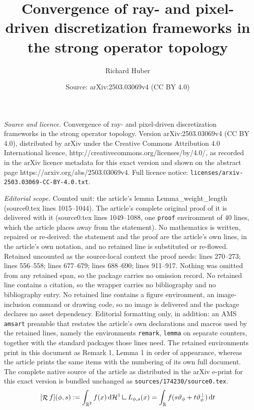 \documentclass[10pt,a4paper]{amsart}
\title{Convergence of ray- and pixel-driven discretization frameworks in the strong operator topology}
\author{Richard Huber}
\date{Source: arXiv:2503.03069v4 (CC BY 4.0)}
\DeclareMathOperator{\RR}{\mathbb{R}}
\DeclareMathOperator{\Radon}{\mathcal{R}}
\newcommand{\dd}[1]{\,\mathrm{d}{#1}}
\newcommand{\mres}{\mathbin{\vrule height 1.6ex depth 0pt width
0.13ex\vrule height 0.13ex depth 0pt width 1.3ex}}
\begin{document}
\maketitle

\noindent\emph{Source and licence.} Convergence of ray- and pixel-driven discretization frameworks in the strong operator topology. Version arXiv:2503.03069v4 (CC BY 4.0), distributed by arXiv under the Creative Commons Attribution 4.0 International licence, http://creativecommons.org/licenses/by/4.0/, as recorded in the arXiv licence metadata for this exact version and shown on the abstract page https://arxiv.org/abs/2503.03069v4. Full licence notice: \texttt{licenses/arxiv-2503.03069-CC-BY-4.0.txt}.\par\smallskip

\noindent\textit{Editorial scope.} Counted unit: the article's lemma Lemma\_weight\_length (source0.tex lines 1015--1044). The article's complete original proof of it is delivered with it (source0.tex lines 1049--1088, one \texttt{proof} environment of 40 lines, which the article places away from the statement). No mathematics is written, repaired or re-derived: the statement and the proof are the article's own lines, in the article's own notation, and no retained line is substituted or re-flowed.  Retained uncounted as the source-local context the proof needs: lines 270--273; lines 556--558; lines 677--679; lines 688--690; lines 911--917.  Nothing was omitted from any retained span, so the package carries no omission record.  No retained line contains a citation, so the wrapper carries no bibliography and no bibliography entry.  No retained line contains a figure environment, an image-inclusion command or drawing code, so no image is delivered and the package declares no asset dependency.  Editorial formatting only, in addition: an AMS \texttt{amsart} preamble that restates the article's own declarations and macros used by the retained lines, namely the environments \texttt{remark}, \texttt{lemma} on separate counters, together with the standard packages those lines need.  The retained environments print in this document as Remark 1, Lemma 1 in order of appearance, whereas the article prints the same items with the numbering of its own full document.  The complete native source of the article as distributed in the arXiv e-print for this exact version is bundled unchanged as \texttt{sources/174230/source0.tex}.
\begin{align}
\label{equ_def_radon_transform}
[\Radon f](\phi,s):= \int_{\RR^2} f(x) \dd {\mathcal{H}^{1}\mres L_{\phi,s}}(x) = \int_{\RR} f(s\vartheta_\phi+t \vartheta_\phi^{\perp}) \dd t 
\end{align}
\end{document}
